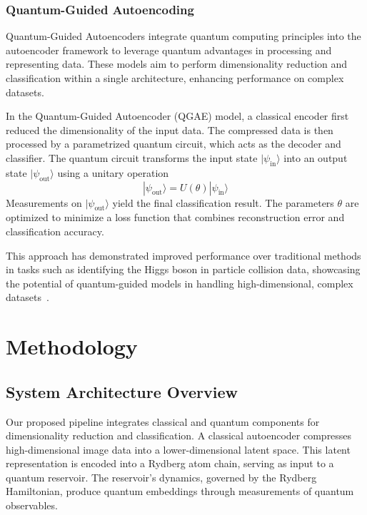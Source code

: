 \documentclass[conference]{IEEEtran}
\begin{document}
\subsubsection{Quantum-Guided Autoencoding}
Quantum-Guided Autoencoders integrate quantum 
computing principles into the autoencoder framework 
to leverage quantum advantages in processing and 
representing data. These models aim to perform 
dimensionality reduction and classification within a 
single architecture, enhancing performance on complex 
datasets.

In the Quantum-Guided Autoencoder (QGAE) model, a 
classical encoder first reduced the dimensionality
of the input data. The compressed data is then processed 
by a parametrized quantum circuit, which acts as the decoder
and classifier. The quantum circuit transforms the 
input state \( |\psi_{\text{in}}\rangle \) into an
output state \( |\psi_{\text{out}}\rangle \) using a unitary operation
\begin{equation}
    |\psi_{\text{out}}\rangle = U(\theta) |\psi_{\text{in}}\rangle
\end{equation}
Measurements on \( |\psi_{\text{out}}\rangle \) yield the final
classification result. The parameters \( \theta \) are
optimized to minimize a loss function that combines
reconstruction error and classification accuracy.


This approach has demonstrated improved performance 
over traditional methods in tasks such as identifying 
the Higgs boson in particle collision data, 
showcasing the potential of quantum-guided models in 
handling high-dimensional, complex datasets~\cite{belisGuidedQuantumCompression2024}.

\section{Methodology}
\subsection{System Architecture Overview}
Our proposed pipeline integrates classical and quantum 
components for dimensionality reduction and classification. 
A classical autoencoder compresses high-dimensional image 
data into a lower-dimensional latent space. This latent 
representation is encoded into a Rydberg atom chain, 
serving as input to a quantum reservoir. The reservoir's 
dynamics, governed by the Rydberg Hamiltonian, produce 
quantum embeddings through measurements of quantum observables.
\end{document}
